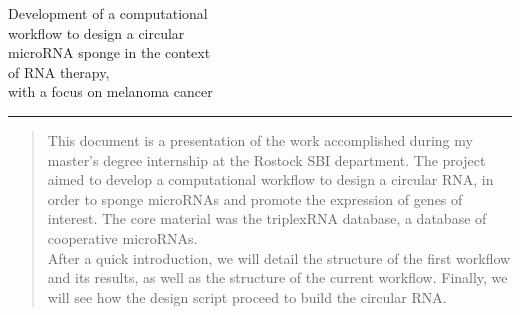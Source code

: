 \documentclass[a4paper,12pt]{report}
\begin{document}
\begin{titlepage}
	\BgThispage
	\vspace*{0.11\textheight}
	\noindent
	\textcolor{yourcolor}{\Huge{Development of a computational \\ \newline  workflow to design a circular \\ \newline microRNA sponge  in the context \\ \newline of RNA therapy,\\ \newline with a focus on melanoma cancer  }}
	
	\vspace*{4cm}\par
	
	\noindent
	\begin{minipage}{0.30\linewidth}
		\begin{flushright}
			\printauthor
		\end{flushright}
	\end{minipage} \hspace{15pt}
	\begin{minipage}{0.05\linewidth}       %
		\rule{1pt}{175pt}                   %
	\end{minipage} \hspace{-10pt}
	\begin{minipage}{0.60\linewidth}
		\vspace{5pt}
		\begin{abstract} 
			This document is a presentation of the work accomplished during my master's degree internship at the Rostock SBI department. The project aimed to develop a computational workflow to design a circular RNA, in order to sponge microRNAs and promote the expression of genes of interest. The core material was the triplexRNA database, a database of cooperative microRNAs. \\
			After a quick introduction, we will detail the structure of the first workflow and its results, as well as the structure of the current workflow. Finally, we will see how the design script proceed to build the circular RNA.
		\end{abstract}
	\end{minipage}
\end{titlepage}


\end{document}
